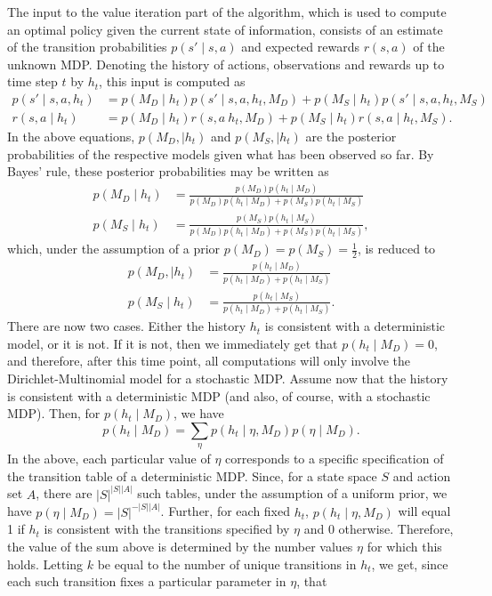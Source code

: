 \documentclass{scrartcl}
\begin{document}
The input to the value iteration part of the algorithm, which is used to compute an optimal policy given the current state of information, consists of an estimate of the transition probabilities $p(s' \mid s, a)$ and expected rewards $r(s, a)$ of the unknown MDP. Denoting the history of actions, observations and rewards up to time step $t$ by $h_t$, this input is computed as
\begin{align*}
p( s' \mid s, a, h_t ) & = p(M_D \mid h_t ) p( s' \mid s, a, h_t, M_D) + p(M_S \mid h_t ) p( s' \mid s, a, h_t, M_S) \\
r( s, a \mid h_t ) & = p(M_D \mid h_t ) r(s, a \ h_t, M_D) + p(M_S \mid h_t ) r(s, a \mid h_t, M_S) .
\end{align*}
In the above equations, $p(M_D, \mid h_t )$ and $p(M_S, \mid h_t )$ are the posterior probabilities of the respective models given what has been observed so far. By Bayes' rule, these posterior probabilities may be written as
\begin{align*}
p(M_D \mid h_t) & = \frac{p(M_D) p(h_t \mid M_D)}{p(M_D) p(h_t \mid M_D) + p(M_S) p(h_t \mid M_S)} \\
p(M_S \mid h_t) & = \frac{p(M_S) p(h_t \mid M_S)}{p(M_D) p(h_t \mid M_D) + p(M_S) p(h_t \mid M_S)} ,
\end{align*}
which, under the assumption of a prior $p(M_D) = p(M_S) = \frac{1}{2}$, is reduced to
\begin{align*}
p(M_D, \mid h_t ) & = \frac{p(h_t \mid M_D)}{p(h_t \mid M_D) + p(h_t \mid M_S)} \\
p(M_S \mid h_t ) & = \frac{p(h_t \mid M_S)}{p(h_t \mid M_D) + p(h_t \mid M_S)} .
\end{align*}
There are now two cases. Either the history $h_t$ is consistent with a deterministic model, or it is not. If it is not, then we immediately get that $p(h_t \mid M_D) = 0$, and therefore, after this time point, all computations will only involve the Dirichlet-Multinomial model for a stochastic MDP. Assume now that the history is consistent with a deterministic MDP (and also, of course, with a stochastic MDP). Then, for $p(h_t \mid M_D)$, we have
\begin{equation*}
p(h_t \mid M_D) = \sum_{\eta} p(h_t \mid \eta, M_D) p(\eta \mid M_D) .
\end{equation*}
In the above, each particular value of $\eta$ corresponds to a specific specification of the transition table of a deterministic MDP. Since, for a state space $S$ and action set $A$, there are $|S|^{|S||A|}$ such tables, under the assumption of a uniform prior, we have $p(\eta \mid M_D) = |S|^{-|S||A|}$. Further, for each fixed $h_t$, $p(h_t \mid \eta, M_D)$ will equal 1 if $h_t$ is consistent with the transitions specified by $\eta$ and 0 otherwise. Therefore, the value of the sum above is determined by the number values $\eta$ for which this holds. Letting $k$ be equal to the number of unique transitions in $h_t$, we get, since each such transition fixes a particular parameter in $\eta$, that 
\end{document}
